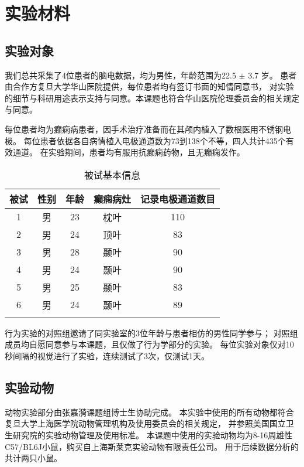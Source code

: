 \section{实验材料}

\subsection{实验对象}
我们总共采集了4位患者的脑电数据，均为男性，年龄范围为22.5 $\pm$ 3.7 岁。
患者由合作方复旦大学华山医院提供，每位患者均有签订书面的知情同意书，
对实验的细节与科研用途表示支持与同意。本课题也符合华山医院伦理委员会的相关规定与同意。

每位患者均为癫痫病患者，因手术治疗准备而在其颅内植入了数根医用不锈钢电极。
每位患者依据各自病情植入电极通道数为73到138个不等，四人共计435个有效通道。
在实验期间，患者均有服用抗癫痫药物，且无癫痫发作。

\begin{table}[h]
    \centering
    \caption{被试基本信息}
    \label{tab:patient_info}
    \begin{tabular}{ccccc}
        \hline\noalign{\smallskip}
        被试 & 性别 & 年龄 & 癫痫病灶 & 记录电极通道数目 \\
        \hline\noalign{\smallskip}
        1 & 男 & 23 & 枕叶 & 110 \\ %
        2 & 男 & 24 & 顶叶 &  83 \\ %
        3 & 男 & 28 & 颞叶 &  90 \\ %
        4 & 男 & 24 & 颞叶 &  90 \\ %
        5 & 男 & 25 & 颞叶 &  83 \\ %
        6 & 男 & 24 & 颞叶 &  89 \\ %

        \hline\noalign{\smallskip}

    \end{tabular}
\end{table}

行为实验的对照组邀请了同实验室的3位年龄与患者相仿的男性同学参与；
对照组成员均自愿同意参与本课题，且仅做了行为学部分的实验。
每位实验对象仅对10秒间隔的视觉进行了实验，连续测试了3次，仅测试1天。

\subsection{实验动物}
动物实验部分由张嘉漪课题组博士生协助完成。
本实验中使用的所有动物都符合复旦大学上海医学院动物管理机构及使用委员会的相关规定，
并参照美国国立卫生研究院的实验动物管理及使用标准。
本课题中使用的实验动物均为8-16周雄性C57/BL6J小鼠，购买自上海斯莱克实验动物有限责任公司。
用于后续数据分析的共计两只小鼠。

